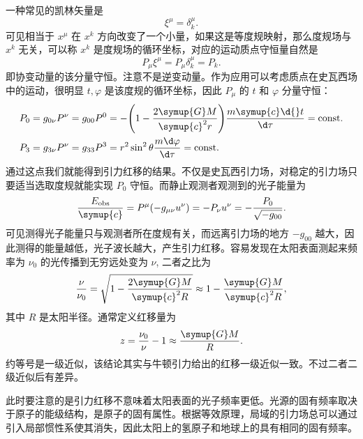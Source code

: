 \documentclass[UTF8, 12pt, a4paper, oneside, onecolumn, fontset=none]{ctexart}
\begin{document}
一种常见的凯林矢量是
\begin{equation}
\xi^{\mu}=\delta^{\mu}_{k}.
\end{equation}
可见相当于 $x^{\mu}$ 在 $x^{k}$ 方向改变了一个小量，如果这是等度规映射，那么度规场与 $x^{k}$ 无关，可以称 $x^{k}$ 是度规场的循环坐标，对应的运动质点守恒量自然是
\begin{equation}
P_{\mu}\xi^{\mu}=P_{\mu}\delta^{\mu}_{k}=P_{k}.
\end{equation}
即协变动量的该分量守恒。注意不是逆变动量。作为应用可以考虑质点在史瓦西场中的运动，很明显 $t,\varphi$ 是该度规的循环坐标，因此 $P_{\mu}$ 的 $t$ 和 $\varphi$ 分量守恒：
\begin{align}
P_{0}&=g_{0\nu}P^{\nu}=g_{00}P^{0}=-\mleft(1-\frac{2\symup{G}M}{\symup{c}^{2}r}\mright)\frac{m\symup{c}\d{}t}{\d\tau}=\mathrm{const}.\\
P_{3}&=g_{3\nu}P^{\nu}=g_{33}P^{3}=r^{2}\sin^{2}{\theta}\frac{m\d\varphi}{\d\tau}=\mathrm{const}.
\end{align}
通过这点我们就能得到引力红移的结果。不仅是史瓦西引力场，对稳定的引力场只要适当选取度规就能实现 $P_{0}$ 守恒。而静止观测者观测到的光子能量为
\begin{equation}
\frac{E_{\mathrm{obs}}}{\symup{c}}=P^{\mu}\mleft(-g_{\mu\nu}u^{\nu}\mright)=-P_{\nu}u^{\nu}=-\frac{P_{0}}{\sqrt{-g_{00}}}.
\end{equation}
可见测得光子能量只与观测者所在度规有关，而远离引力场的地方 $-g_{00}$ 越大，因此测得的能量越低，光子波长越大，产生引力红移。容易发现在太阳表面测起来频率为 $\nu_{0}$ 的光传播到无穷远处变为 $\nu$, 二者之比为
\begin{equation}
\frac{\nu}{\nu_{0}}=\sqrt{1-\frac{2\symup{G}M}{\symup{c}^{2}R}}\approx1-\frac{\symup{G}M}{\symup{c}^{2}R},
\end{equation}
其中 $R$ 是太阳半径。通常定义红移量为
\begin{equation}
z=\frac{\nu_{0}}{\nu}-1\approx\frac{\symup{G}M}{R}.
\end{equation}
约等号是一级近似，该结论其实与牛顿引力给出的红移一级近似一致。不过二者二级近似后有差异。

此时要注意的是引力红移不意味着太阳表面的光子频率更低。光源的固有频率取决于原子的能级结构，是原子的固有属性。根据等效原理，局域的引力场总可以通过引入局部惯性系使其消失，因此太阳上的氢原子和地球上的具有相同的固有频率。
\end{document}
